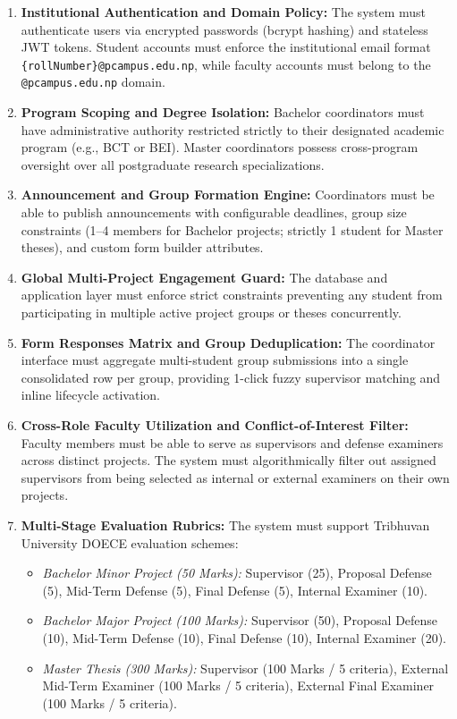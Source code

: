 \begin{enumerate}[label=\textbf{FR\arabic*.}]
    \item \textbf{Institutional Authentication and Domain Policy:} The system must authenticate users via encrypted passwords (bcrypt hashing) and stateless JWT tokens. Student accounts must enforce the institutional email format \texttt{\{rollNumber\}@pcampus.edu.np}, while faculty accounts must belong to the \texttt{@pcampus.edu.np} domain.
    
    \item \textbf{Program Scoping and Degree Isolation:} Bachelor coordinators must have administrative authority restricted strictly to their designated academic program (e.g., BCT or BEI). Master coordinators possess cross-program oversight over all postgraduate research specializations.
    
    \item \textbf{Announcement and Group Formation Engine:} Coordinators must be able to publish announcements with configurable deadlines, group size constraints (1--4 members for Bachelor projects; strictly 1 student for Master theses), and custom form builder attributes.
    
    \item \textbf{Global Multi-Project Engagement Guard:} The database and application layer must enforce strict constraints preventing any student from participating in multiple active project groups or theses concurrently.
    
    \item \textbf{Form Responses Matrix and Group Deduplication:} The coordinator interface must aggregate multi-student group submissions into a single consolidated row per group, providing 1-click fuzzy supervisor matching and inline lifecycle activation.
    
    \item \textbf{Cross-Role Faculty Utilization and Conflict-of-Interest Filter:} Faculty members must be able to serve as supervisors and defense examiners across distinct projects. The system must algorithmically filter out assigned supervisors from being selected as internal or external examiners on their own projects.
    
    \item \textbf{Multi-Stage Evaluation Rubrics:} The system must support Tribhuvan University DOECE evaluation schemes:
    \begin{itemize}
        \item \textit{Bachelor Minor Project (50 Marks):} Supervisor (25), Proposal Defense (5), Mid-Term Defense (5), Final Defense (5), Internal Examiner (10).
        \item \textit{Bachelor Major Project (100 Marks):} Supervisor (50), Proposal Defense (10), Mid-Term Defense (10), Final Defense (10), Internal Examiner (20).
        \item \textit{Master Thesis (300 Marks):} Supervisor (100 Marks / 5 criteria), External Mid-Term Examiner (100 Marks / 5 criteria), External Final Examiner (100 Marks / 5 criteria).
    \end{itemize}
    

\end{enumerate}
